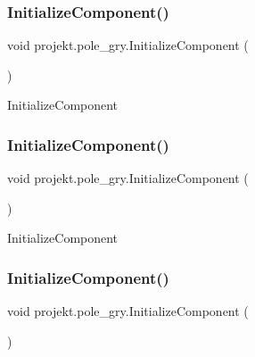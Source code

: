 \subsubsection{\texorpdfstring{Initialize\+Component()}{InitializeComponent()}\hspace{0.1cm}{\footnotesize\ttfamily [5/9]}}
{\footnotesize\ttfamily void projekt.\+pole\+\_\+gry.\+Initialize\+Component (\begin{DoxyParamCaption}{ }\end{DoxyParamCaption})\hspace{0.3cm}{\ttfamily [inline]}}



Initialize\+Component 

\mbox{\label{classprojekt_1_1pole__gry_acb91309f48624fdcd50a6f023a810f02}} 
\subsubsection{\texorpdfstring{Initialize\+Component()}{InitializeComponent()}\hspace{0.1cm}{\footnotesize\ttfamily [6/9]}}
{\footnotesize\ttfamily void projekt.\+pole\+\_\+gry.\+Initialize\+Component (\begin{DoxyParamCaption}{ }\end{DoxyParamCaption})\hspace{0.3cm}{\ttfamily [inline]}}



Initialize\+Component 

\mbox{\label{classprojekt_1_1pole__gry_acb91309f48624fdcd50a6f023a810f02}} 
\subsubsection{\texorpdfstring{Initialize\+Component()}{InitializeComponent()}\hspace{0.1cm}{\footnotesize\ttfamily [7/9]}}
{\footnotesize\ttfamily void projekt.\+pole\+\_\+gry.\+Initialize\+Component (\begin{DoxyParamCaption}{ }\end{DoxyParamCaption})\hspace{0.3cm}{\ttfamily [inline]}}



